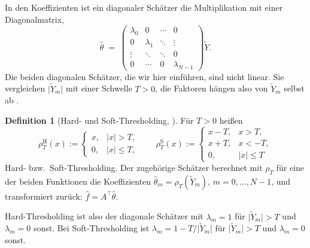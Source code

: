 \documentclass[a4paper,11pt,bibliography=totoc,listof=totoc,headinclude=true,cleardoublepage=empty,oneside]{scrbook}
\theoremstyle{plain}
\theoremstyle{definition}
\newtheorem{Definition}[Satz]{Definition}
\begin{document}
In den Koeffizienten ist ein diagonaler Schätzer die Multiplikation mit einer
Diagonalmatrix,
\[
  \hat\theta \;=\;
  \begin{pmatrix}
    \lambda_0 & 0 & \cdots & 0 \\
    0 & \lambda_1 & \ddots & \vdots \\
    \vdots & \ddots & \ddots & 0 \\
    0 & \cdots & 0 & \lambda_{N-1}
  \end{pmatrix}
  \tilde Y .
\]
Die beiden diagonalen Schätzer, die wir hier einführen, sind nicht linear. Sie vergleichen
$\lvert\tilde Y_m\rvert$ mit einer Schwelle $T>0$, die Faktoren hängen also von
$\tilde Y_m$ selbst ab \cite[Kap.~11.2.2]{mallat}. %
 
\begin{Definition}[Hard- und Soft-Thresholding, {\cite[Gl.~(11.47), (11.49)]{mallat}}] %
\label{def:thresholding}
Für $T>0$ hei\ss en
\[
  \rho^{\mathrm H}_T(x) :=
  \begin{cases} x, & \lvert x\rvert > T,\\ 0, & \lvert x\rvert\le T,\end{cases}
  \qquad
  \rho^{\mathrm S}_T(x) :=
  \begin{cases} x - T, & x > T,\\ x + T, & x < -T,\\ 0, & \lvert x\rvert\le T\end{cases}
\]
Hard- bzw.\ Soft-Thresholding. Der zugehörige Schätzer berechnet mit $\rho_T$
für eine der beiden Funktionen die Koeffizienten
$\hat\theta_m = \rho_T(\tilde Y_m)$, $m = 0,\dots,N-1$, und transformiert
zurück: $\hat f = A^\top\hat\theta$.
\end{Definition}
 
Hard-Thresholding ist also der diagonale Schätzer mit $\lambda_m = 1$ für
$\lvert\tilde Y_m\rvert > T$ und $\lambda_m = 0$ sonst. Bei Soft-Thresholding
ist $\lambda_m = 1 - T/\lvert\tilde Y_m\rvert$ für $\lvert\tilde Y_m\rvert > T$
und $\lambda_m = 0$ sonst.
 
\end{document}
